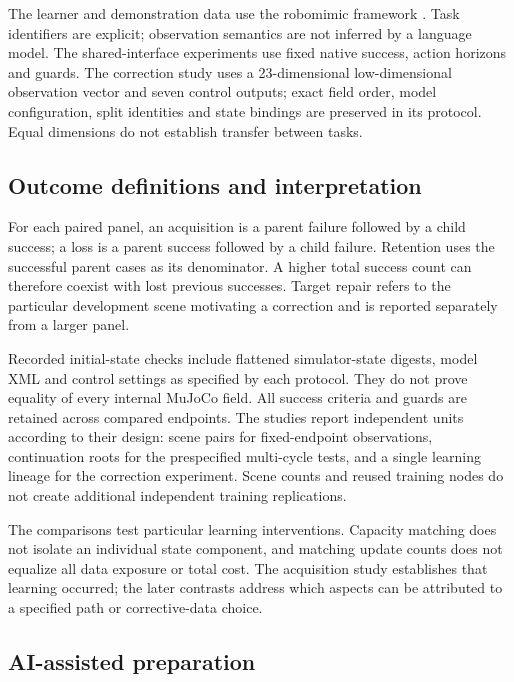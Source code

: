 \documentclass[10pt,letterpaper]{article}
\begin{document}
The learner and demonstration data use the robomimic framework
\cite{pmlr-v164-mandlekar22a}. Task identifiers are explicit;
observation semantics are not inferred by a language model. The
shared-interface experiments use fixed native success, action horizons
and guards. The correction study uses a 23-dimensional low-dimensional
observation vector and seven control outputs; exact field order, model
configuration, split identities and state bindings are preserved in its
protocol. Equal dimensions do not establish transfer between tasks.

\subsection{Outcome definitions and
interpretation}\label{outcome-definitions-and-interpretation}

For each paired panel, an acquisition is a parent failure followed by a
child success; a loss is a parent success followed by a child failure.
Retention uses the successful parent cases as its denominator. A higher
total success count can therefore coexist with lost previous successes.
Target repair refers to the particular development scene motivating a
correction and is reported separately from a larger panel.

Recorded initial-state checks include flattened simulator-state digests,
model XML and control settings as specified by each protocol. They do
not prove equality of every internal MuJoCo field. All success criteria
and guards are retained across compared endpoints. The studies report
independent units according to their design: scene pairs for
fixed-endpoint observations, continuation roots for the prespecified
multi-cycle tests, and a single learning lineage for the correction
experiment. Scene counts and reused training nodes do not create
additional independent training replications.

The comparisons test particular learning interventions. Capacity
matching does not isolate an individual state component, and matching
update counts does not equalize all data exposure or total cost. The
acquisition study establishes that learning occurred; the later
contrasts address which aspects can be attributed to a specified path or
corrective-data choice.

\subsection{AI-assisted preparation}\label{ai-assisted-preparation}
\end{document}
